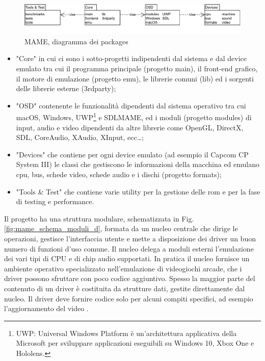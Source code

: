 \begin{figure}[H]
	\includegraphics[width=\linewidth]{immagini/mame_arch}
	\caption{MAME, diagramma dei packages}
	\label{fig:mame_arch}
\end{figure}

\begin{itemize}
	\item "Core" in cui ci sono i sotto-progetti indipendenti dal sistema e dal device emulato tra cui il programma principale (progetto main), il front-end grafico, il motore di emulazione (progetto emu), le librerie comuni (lib) ed i sorgenti delle librerie esterne (3rdparty);
	\item "OSD" contenente le funzionalità dipendenti dal sistema operativo tra cui macOS, Windows, UWP\footnote{UWP: Universal Windows Platform è un'architettura applicativa della Microsoft per sviluppare applicazioni eseguibili su Windows 10, Xbox One e Hololens.} e SDLMAME, ed i moduli (progetto modules) di input, audio e video dipendenti da altre librerie come OpenGL, DirectX, SDL, CoreAudio, XAudio, XInput, ecc\dots;
	\item "Devices" che contiene per ogni device emulato (ad esempio il Capcom CP System III) le classi che gestiscono le informazioni della macchina ed emulano cpu, bus, schede video, schede audio e i dischi (progetto formats);
	\item "Tools \& Test" che contiene varie utility per la gestione delle rom e per la fase di testing e performance.
\end{itemize}

Il progetto ha una struttura modulare, schematizzata in Fig. \ref{fig:mame_schema_moduli_d}, formata da un nucleo centrale che dirige le operazioni, gestisce l’interfaccia utente e mette a disposizione dei driver un buon numero di funzioni d'uso comune. Il nucleo delega a moduli esterni l'emulazione dei vari tipi di CPU e di chip audio supportati. In pratica il nucleo fornisce un ambiente operativo specializzato nell'emulazione di videogiochi arcade, che i driver possono sfruttare con poco codice aggiuntivo. Spesso la maggior parte del contenuto di un driver è costituita da strutture dati, gestite direttamente dal nucleo. Il driver deve fornire codice solo per alcuni compiti specifici, ad esempio l'aggiornamento del video \parencite{Il_progetto_MAME}.

